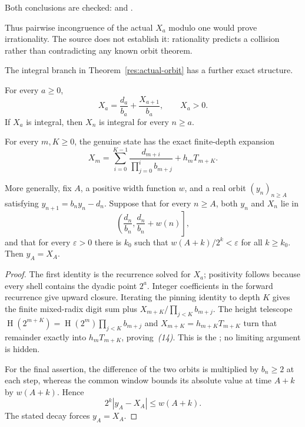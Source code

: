 \documentclass[11pt]{article}
\newcommand{\hgt}{\operatorname{H}}
\begin{document}
Both conclusions are checked:
 and
.

Thus pairwise incongruence of the actual $X_a$ modulo one would prove
irrationality.  The source does not establish it: rationality predicts a
collision rather than contradicting any known orbit theorem.

The integral branch in Theorem~\ref{res:actual-orbit} has a further exact
structure.

\begin{theorem}\label{res:pinning}
For every $a\ge0$,
\[
 X_a=\frac{d_a}{b_a}+\frac{X_{a+1}}{b_a},\qquad X_a>0.
\]
If $X_a$ is integral, then $X_n$ is integral for every $n\ge a$.

For every $m,K\ge0$, the genuine state has the exact finite-depth expansion
\[
 X_m=
 \sum_{i=0}^{K-1}
   \frac{d_{m+i}}{\prod_{j=0}^{i}b_{m+j}}
 +h_mT_{m+K}.                                      \tag{14}
\]

More generally, fix $A$, a positive width function $w$, and a real orbit
$(y_n)_{n\ge A}$ satisfying $y_{n+1}=b_ny_n-d_n$.  Suppose that for every
$n\ge A$, both $y_n$ and $X_n$ lie in
\[
 \left(\frac{d_n}{b_n},\frac{d_n}{b_n}+w(n)\right],
\]
and that for every $\varepsilon>0$ there is $k_0$ such that
$w(A+k)/2^k<\varepsilon$ for all $k\ge k_0$.  Then $y_A=X_A$.
\end{theorem}

\begin{proof}
The first identity is the recurrence solved for $X_a$; positivity follows
because every shell contains the dyadic point $2^a$.  Integer coefficients in
the forward recurrence give upward closure.  Iterating the pinning identity to
depth $K$ gives the finite mixed-radix digit sum plus
$X_{m+K}/\prod_{j<K}b_{m+j}$.  The height telescope
$\hgt(2^{m+K})=\hgt(2^m)\prod_{j<K}b_{m+j}$ and
$X_{m+K}=h_{m+K}T_{m+K}$ turn that remainder exactly into $h_mT_{m+K}$,
proving~\emph{(14)}.  This is the
; no limiting argument is hidden.

For the final assertion, the
difference of the two orbits is multiplied by $b_n\ge2$ at each step, whereas
the common window bounds its absolute value at time $A+k$ by $w(A+k)$.
Hence
\[
 2^k|y_A-X_A|\le w(A+k).
\]
The stated decay forces $y_A=X_A$.
\end{proof}
\end{document}
